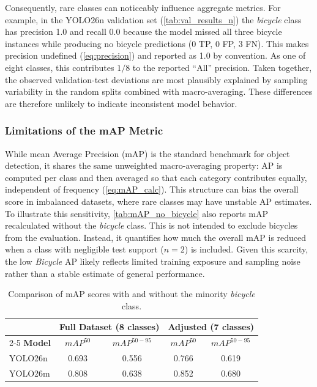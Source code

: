 Consequently, rare classes can noticeably influence aggregate metrics. For example, in the YOLO26n validation set (\autoref{tab:val_results_n}) the \textit{bicycle} class has precision 1.0 and recall 0.0 because the model missed all three bicycle instances while producing no bicycle predictions (0 TP, 0 FP, 3 FN). This makes precision undefined (\autoref{eq:precision}) and reported as 1.0 by convention. As one of eight classes, this contributes $1/8$ to the reported ``All'' precision. Taken together, the observed validation-test deviations are most plausibly explained by sampling variability in the random splits combined with macro-averaging. These differences are therefore unlikely to indicate inconsistent model behavior.

\subsubsection{Limitations of the mAP Metric}
While mean Average Precision (mAP) is the standard benchmark for object detection, it shares the same unweighted macro-averaging property: AP is computed per class and then averaged so that each category contributes equally, independent of frequency (\autoref{eq:mAP_calc}). This structure can bias the overall score in imbalanced datasets, where rare classes may have unstable AP estimates. To illustrate this sensitivity, \autoref{tab:mAP_no_bicycle} also reports mAP recalculated without the \textit{bicycle} class. This is not intended to exclude bicycles from the evaluation. Instead, it quantifies how much the overall mAP is reduced when a class with negligible test support (\(n=2\)) is included. Given this scarcity, the low \textit{Bicycle} AP likely reflects limited training exposure and sampling noise rather than a stable estimate of general performance.

\begin{table}[H]
\centering
\renewcommand{\arraystretch}{1.2} %
\caption{Comparison of mAP scores with and without the minority \textit{bicycle} class.}
\label{tab:mAP_no_bicycle}
\begin{tabular}{|l|cc|cc|}
\hline
& \multicolumn{2}{c|}{\textbf{Full Dataset (8 classes)}} & \multicolumn{2}{c|}{\textbf{Adjusted (7 classes)}} \\ \cline{2-5}
\textbf{Model} & \textbf{$mAP^{50}$} & \textbf{$mAP^{50-95}$} & \textbf{$mAP^{50}$} & \textbf{$mAP^{50-95}$} \\ \hline
YOLO26n & 0.693 & 0.556 & 0.766 & 0.619 \\ \hline
YOLO26m & 0.808 & 0.638 & 0.852 & 0.680 \\ \hline
\end{tabular}
\end{table}

